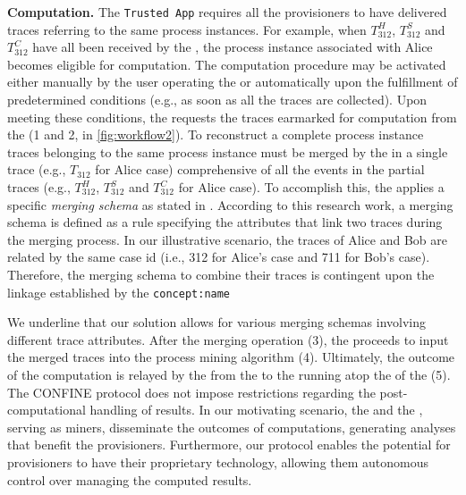 \textbf{Computation.} The \texttt{Trusted App} requires all the provisioners to have delivered traces referring to the same process instances. For example, when $T^H_{312}$, $T^S_{312}$ and $T^C_{312}$ have all been received by the , the process instance associated with Alice becomes eligible for computation. The computation procedure may be activated either manually by the user operating the  or automatically upon the fulfillment of predetermined conditions (e.g., as soon as all the traces are collected). Upon meeting these conditions, the  requests the traces earmarked for computation from the  (1 and 2, in \cref{fig:workflow2}). To reconstruct a complete process instance traces belonging to the same process instance must be merged by the  in a single trace (e.g., $T_{312}$ for Alice case) comprehensive of all the events in the partial traces (e.g., $T^H_{312}$, $T^S_{312}$ and $T^C_{312}$ for Alice case). To accomplish this, the  applies a specific \textit{merging schema} as stated in \cite{claes2014merging}. According to this research work, a merging schema is defined as a rule specifying the attributes that link two traces during the merging process. In our illustrative scenario, the traces of Alice and Bob are related by the same case id (i.e., 312 for Alice's case and 711 for Bob's case). Therefore, the merging schema to combine their traces is contingent upon the linkage established by the \texttt{concept:name} %

We underline that our solution allows for various merging schemas involving different trace attributes. After the merging operation (3), the  proceeds to input the merged traces into the process mining algorithm (4). Ultimately, the outcome of the computation is relayed by the  from the  to the  running atop the  of the  (5). The CONFINE protocol does not impose restrictions regarding the post-computational handling of results. In our motivating scenario, the  and the , serving as miners, disseminate the outcomes of computations, generating analyses that benefit the provisioners. Furthermore, our protocol enables the potential for provisioners to have their proprietary  technology, allowing them autonomous control over managing the computed results.

